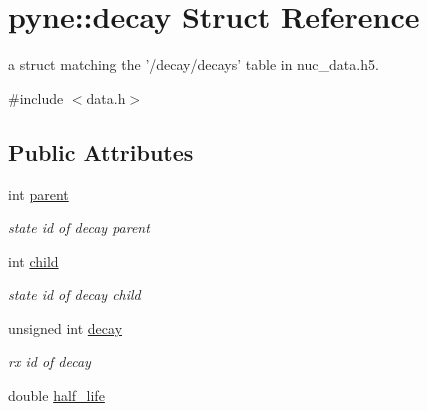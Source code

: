 \hypertarget{structpyne_1_1decay}{\section{pyne\-:\-:decay Struct Reference}
\label{structpyne_1_1decay}
}


a struct matching the '/decay/decays' table in nuc\-\_\-data.\-h5.  




{\ttfamily \#include $<$data.\-h$>$}

\subsection*{Public Attributes}
\begin{DoxyCompactItemize}
\item 
\hypertarget{structpyne_1_1decay_a49696dc372feeb09800f96d6733367f2}{int \hyperlink{structpyne_1_1decay_a49696dc372feeb09800f96d6733367f2}{parent}}\label{structpyne_1_1decay_a49696dc372feeb09800f96d6733367f2}

\begin{DoxyCompactList}\small\item\em state id of decay parent \end{DoxyCompactList}\item 
\hypertarget{structpyne_1_1decay_a945a2d85e13b6457072dcbc3f53b1d68}{int \hyperlink{structpyne_1_1decay_a945a2d85e13b6457072dcbc3f53b1d68}{child}}\label{structpyne_1_1decay_a945a2d85e13b6457072dcbc3f53b1d68}

\begin{DoxyCompactList}\small\item\em state id of decay child \end{DoxyCompactList}\item 
\hypertarget{structpyne_1_1decay_acd08ac0848d8491d1320fe538f0ed35e}{unsigned int \hyperlink{structpyne_1_1decay_acd08ac0848d8491d1320fe538f0ed35e}{decay}}\label{structpyne_1_1decay_acd08ac0848d8491d1320fe538f0ed35e}

\begin{DoxyCompactList}\small\item\em rx id of decay \end{DoxyCompactList}\item 
\hypertarget{structpyne_1_1decay_aff2afc2b50e4e53eb60a67d2448cb889}{double \hyperlink{structpyne_1_1decay_aff2afc2b50e4e53eb60a67d2448cb889}{half\-\_\-life}}\label{structpyne_1_1decay_aff2afc2b50e4e53eb60a67d2448cb889}


\end{DoxyCompactItemize}
